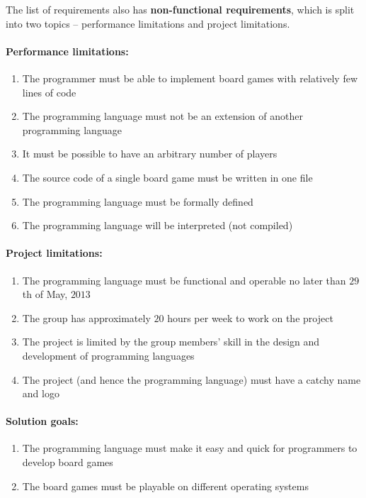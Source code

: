 The list of requirements also has \textbf{non-functional requirements}, which is
split into two topics -- performance limitations and project limitations.

\paragraph*{Performance limitations:}
\begin{enumerate}
  \item The programmer must be able to implement board games with relatively few
    lines of code
  \item The programming language must not be an extension of another programming
    language
  \item It must be possible to have an arbitrary number of players
  \item The source code of a single board game must be written in one file
  \item The programming language must be formally defined
  \item The programming language will be interpreted (not compiled)
\end{enumerate}

\paragraph*{Project limitations:}
\begin{enumerate}
  \item The programming language must be functional and operable no later than
    $29$th of May, $2013$
  \item The group has approximately $20$ hours per week to work on the project
  \item The project is limited by the group members' skill in the design and
    development of programming languages
  \item The project (and hence the programming language) must have a catchy name
    and logo
\end{enumerate}

\paragraph*{Solution goals:}
\begin{enumerate}
  \item The programming language must make it easy and quick for programmers to
    develop board games
  \item The board games must be playable on different operating systems
\end{enumerate}


